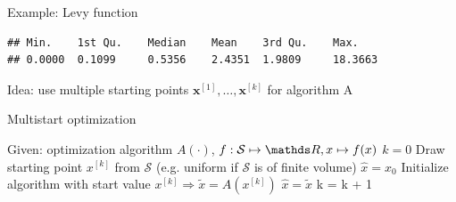 \documentclass[11pt,compress,t,notes=noshow, xcolor=table]{beamer}
\begin{document}
\begin{vbframe}{Example: Levy function}
\footnotesize
\begin{verbatim}
## Min.    1st Qu.    Median    Mean    3rd Qu.    Max.
## 0.0000  0.1099     0.5356    2.4351  1.9809     18.3663
\end{verbatim}








\framebreak
\normalsize








\normalsize
\framebreak

Idea: use multiple starting points $\bm{x}^{[1]}, \ldots, \bm{x}^{[k]}$ for algorithm A

\begin{algorithm}[H]
  \begin{footnotesize}
  \begin{center}
  \caption{Multistart optimization}
    \begin{algorithmic}[1]
    \State Given: optimization algorithm $A(\cdot)$, $f: \mathcal{S} \mapsto \R, x \mapsto f(x)$
    \State $k = 0$
      \Repeat
        \State Draw starting point  $x^{[k]}$ from $\mathcal{S}$ (e.g. uniform if $\mathcal{S}$ is of finite volume)
          $\hat{x}= x_{0}$
        \EndIf
        \State Initialize algorithm with start value $x^{[k]} \Rightarrow \tilde{x} = A(x^{[k]})$
          $\hat{x} = \tilde{x}$
        \EndIf
        \State k = k + 1
      \\
    \end{algorithmic}
    \end{center}
    \end{footnotesize}
\end{algorithm}


\end{vbframe}
\end{document}
